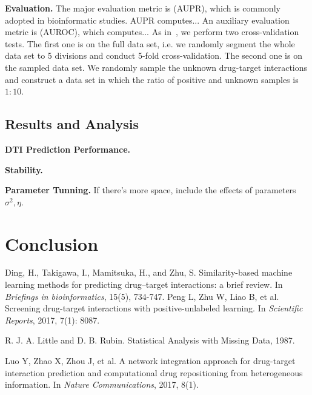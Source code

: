\documentclass[sigconf,anonymous]{acmart}
\begin{document}

\textbf{Evaluation.} The major evaluation metric is  (AUPR), which is commonly adopted in bioinformatic studies. AUPR computes... An auxiliary evaluation metric is (AUROC), which computes... As in~\cite{Luo2017Network}, we perform two cross-validation tests. The first one is on the full data set, i.e. we randomly segment the whole data set to 5 divisions and conduct 5-fold cross-validation. The second one is on the sampled data set.  We randomly sample the unknown drug-target interactions and construct a data set in which the ratio of positive and unknown samples is $1:10$.

\subsection{Results and Analysis}
\textbf{DTI Prediction Performance.}

\textbf{Stability.}

\textbf{Parameter Tunning.} If there's more space, include the effects of parameters $\sigma^2,\eta$. 

\section{Conclusion}\label{sec:conclusion}


\begin{thebibliography}{10}
Ding, H., Takigawa, I., Mamitsuka, H., and Zhu, S. 
\newblock Similarity-based machine learning methods for predicting drug–target interactions: a brief review. \newblock In {\em Briefings in bioinformatics}, 15(5), 734-747.
Peng L, Zhu W, Liao B, et al. 
\newblock Screening drug-target interactions with positive-unlabeled learning. 
\newblock In {\em Scientific Reports}, 2017, 7(1): 8087.

R. J. A. Little and D. B. Rubin. 
\newblock Statistical Analysis with Missing Data, 1987.

Luo Y, Zhao X, Zhou J, et al. 
\newblock A network integration approach for drug-target interaction prediction and computational drug repositioning from heterogeneous information. 
\newblock In {\em Nature Communications}, 2017, 8(1).

%
%
%
\end{thebibliography}
\end{document}
